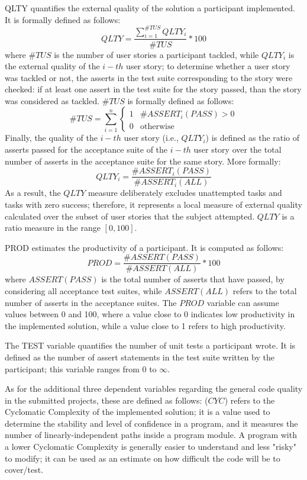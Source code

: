 QLTY quantifies the external quality of the solution a participant implemented. It is formally defined as follows: 
\[
    QLTY = \frac{\sum_{i=1}^{\#TUS} QLTY_i}{\#TUS} * 100 
\]
where $\#TUS$ is the number of user stories a participant tackled, while $QLTY_i$ is the external quality of the $i-th$ user story; to determine whether a user story was tackled or not, the asserts in the test suite corresponding to the story were checked: if at least one assert in the test suite for the story passed, than the story was considered as tackled. $\#TUS$ is formally defined as follows:
\[
    \#TUS = \sum_{i=1}^{n} 
        \begin{cases}
            1 & \text{$\#ASSERT_i(PASS) > 0$}\\
                0 & \text{otherwise}
        \end{cases}
\]
Finally, the quality of the $i-th$ user story (i.e., $QLTY_i$) is defined as the ratio of asserts passed for the acceptance suite of the $i-th$ user story over the total number of asserts in the acceptance suite for the same story. More formally:
\[
    QLTY_i = \frac{\#ASSERT_i(PASS)}{\#ASSERT_i(ALL)}
\]
As a result, the $QLTY$ measure deliberately excludes unattempted tasks and tasks with zero success; therefore, it represents a local measure of external quality calculated over the subset of user stories that the subject attempted. $QLTY$ is a ratio measure in the range $[0, 100]$.

PROD estimates the productivity of a participant. It is computed as follows:
\[
    PROD = \frac{\#ASSERT(PASS)}{\#ASSERT(ALL)} * 100
\]
where $ASSERT(PASS)$ is the total number of asserts that have passed, by considering all acceptance test suites, while $ASSERT(ALL)$ refers to the total number of asserts in the acceptance suites. The $PROD$ variable can assume values between 0 and 100, where a value close to 0 indicates low productivity in the implemented solution, while a value close to 1 refers to high productivity.

The TEST variable quantifies the number of unit tests a participant wrote. It is defined as the number of assert statements in the test suite written by the participant; this variable ranges from 0 to $\infty$.


As for the additional three dependent variables regarding the general code quality in the submitted projects, these are defined as follows:
(\textbf{$CYC$}) refers to the Cyclomatic Complexity of the implemented solution; it is a value used to determine the stability and level of confidence in a program, and it measures the number of linearly-independent paths inside a program module. A program with a lower Cyclomatic Complexity is generally easier to understand and less "risky" to modify; it can be used as an estimate on how difficult the code will be to cover/test.

